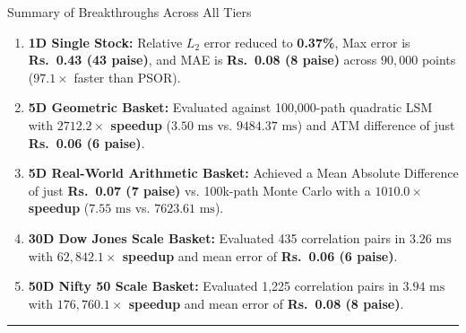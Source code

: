 \documentclass[11pt,a4paper]{article}
\begin{document}
\begin{mathbox}{Summary of Breakthroughs Across All Tiers}
\begin{enumerate}[leftmargin=1.5em]
    \item \textbf{1D Single Stock:} Relative $L_2$ error reduced to \textbf{0.37\%}, Max error is \textbf{Rs.~0.43 (43 paise)}, and MAE is \textbf{Rs.~0.08 (8 paise)} across $90,000$ points ($97.1\times$ faster than PSOR).
    \item \textbf{5D Geometric Basket:} Evaluated against 100,000-path quadratic LSM with \textbf{$2712.2\times$ speedup} ($3.50\text{ ms}$ vs. $9484.37\text{ ms}$) and ATM difference of just \textbf{Rs.~0.06 (6 paise)}.
    \item \textbf{5D Real-World Arithmetic Basket:} Achieved a Mean Absolute Difference of just \textbf{Rs.~0.07 (7 paise)} vs. 100k-path Monte Carlo with a \textbf{$1010.0\times$ speedup} ($7.55\text{ ms}$ vs. $7623.61\text{ ms}$).
    \item \textbf{30D Dow Jones Scale Basket:} Evaluated 435 correlation pairs in $3.26\text{ ms}$ with \textbf{$62,842.1\times$ speedup} and mean error of \textbf{Rs.~0.06 (6 paise)}.
    \item \textbf{50D Nifty 50 Scale Basket:} Evaluated 1,225 correlation pairs in $3.94\text{ ms}$ with \textbf{$176,760.1\times$ speedup} and mean error of \textbf{Rs.~0.08 (8 paise)}.
\end{enumerate}
\end{mathbox}

\vspace{1em}
\hrule
\vspace{1em}
\end{document}
